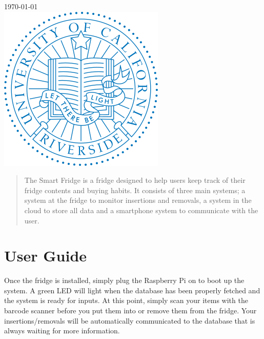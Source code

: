 \begin{titlepage}

{\large \today}\\[2cm] %

\includegraphics[scale=.5]{logo.png}\\[1cm] %

\vfill %

\end{titlepage}


\begin{abstract}
The Smart Fridge is a fridge designed to help users keep track of their fridge contents and buying habits. 
    It consists of three main systems; a system at the fridge to monitor insertions and removals, 
    a system in the cloud to store all data and a smartphone system to communicate with the user.
\end{abstract}

\section{User Guide}


Once the fridge is installed, simply plug the Raspberry Pi on to boot up the system. 
    A green LED will light when the database has been properly fetched and the system is ready for inputs.
    At this point, simply scan your items with the barcode scanner before you put them into or remove them from the fridge.
    Your insertions/removals will be automatically communicated to the database that is always waiting for more information.\\

